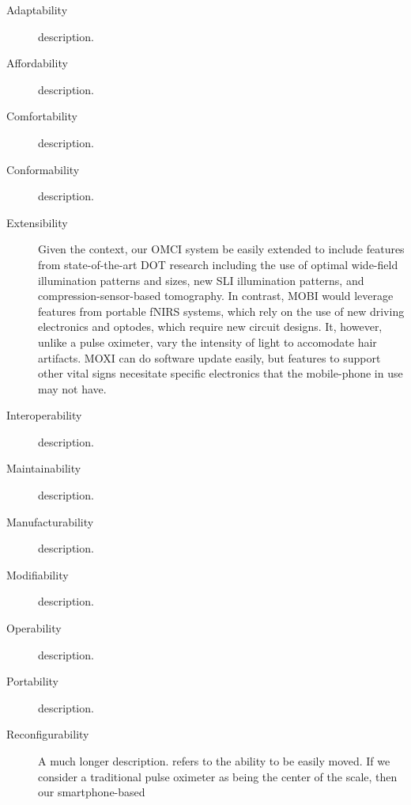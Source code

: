 \begin{description}
   \item[Adaptability] description.
   \item[Affordability] description.
   \item[Comfortability] description.
   \item[Conformability] description.
   \item[Extensibility] Given the context, our \ac{OMCI} system be easily extended to include features from state-of-the-art \ac{DOT} research including the use of optimal wide-field illumination patterns and sizes, new \ac{SLI} illumination patterns, and compression-sensor-based tomography.  In contrast, \ac{MOBI} would leverage features from portable fNIRS systems, which rely on the use of new driving electronics and optodes, which require new circuit designs. It, however, unlike a pulse oximeter, vary the intensity of light to accomodate hair artifacts. \ac{MOXI} can do software update easily, but features to support other vital signs necesitate specific electronics that the mobile-phone in use may not have. 
   \item[Interoperability] description.
   \item[Maintainability] description.
   \item[Manufacturability] description.
   \item[Modifiability] description.
   \item[Operability] description.
   \item[Portability] description.
   \item[Reconfigurability] A much longer description.  refers to the ability to be easily moved. If we consider a traditional pulse oximeter as being the center of the scale, then our smartphone-based
\end{description}


